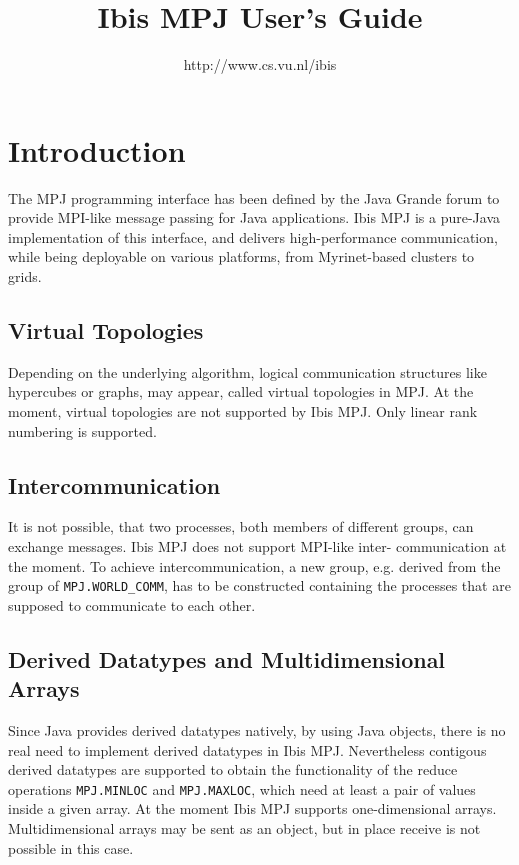 \documentclass[a4paper,10pt]{article}
\begin{document}
\title{Ibis MPJ User's Guide}

\author{http://www.cs.vu.nl/ibis}

\maketitle

\section{Introduction}

The MPJ programming interface has been defined by the Java Grande forum to
provide MPI-like message passing for Java applications. Ibis MPJ is a
pure-Java implementation of this interface, and delivers high-performance
communication, while being deployable on various platforms,
from Myrinet-based clusters to grids.

\subsection{Virtual Topologies}

Depending on the underlying algorithm, logical communication structures 
like hypercubes or graphs, may appear, called virtual topologies in MPJ. 
At the moment, virtual topologies are not supported by Ibis MPJ. Only
linear rank numbering is supported.

\subsection{Intercommunication}

It is not possible, that two processes, both members of different groups, 
can exchange messages. Ibis MPJ does not support MPI-like inter- 
communication at the moment. To achieve intercommunication, a new group, 
e.g. derived from the group of \texttt{MPJ.WORLD\_COMM}, has to be constructed 
containing the processes that are supposed to communicate to each other.

\subsection{Derived Datatypes and Multidimensional Arrays}

Since Java provides derived datatypes natively, by using Java objects, 
there is no real need to implement derived datatypes in Ibis MPJ. 
Nevertheless contigous derived datatypes are supported to obtain the 
functionality of the reduce operations \texttt{MPJ.MINLOC}
and \texttt{MPJ.MAXLOC}, which 
need at least a pair of values inside a given array. At the moment 
Ibis MPJ supports one-dimensional arrays. Multidimensional arrays may 
be sent as an object, but in place receive is not possible in this case.
\end{document}
